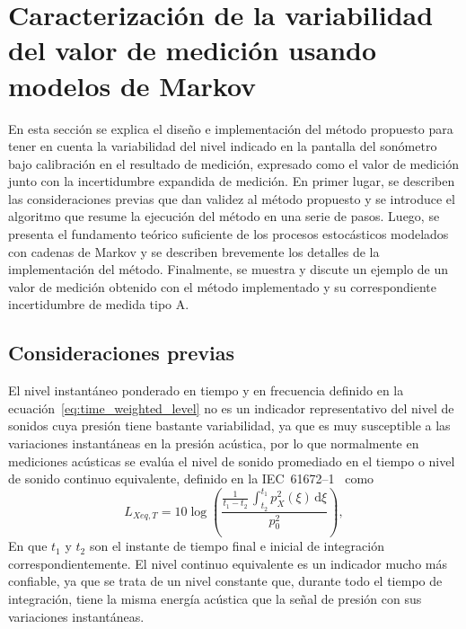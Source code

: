 
\chapter{Caracterización de la variabilidad del valor de medición usando modelos de Markov}

En esta sección se explica el diseño e implementación del método propuesto para tener en cuenta la variabilidad del nivel indicado en la pantalla del sonómetro bajo calibración en el resultado de medición, expresado como el valor de medición junto con la incertidumbre expandida de medición.
En primer lugar, se describen las consideraciones previas que dan validez al método propuesto y se introduce el algoritmo que resume la ejecución del método en una serie de pasos.
Luego, se presenta el fundamento teórico suficiente de los procesos estocásticos modelados con cadenas de Markov y se describen brevemente los detalles de la implementación del método.
Finalmente, se muestra y discute un ejemplo de un valor de medición obtenido con el método implementado y su correspondiente incertidumbre de medida tipo A\@.

\section*{Consideraciones previas}
El nivel instantáneo ponderado en tiempo y en frecuencia definido en la ecuación~\eqref{eq:time_weighted_level} no es un indicador representativo del nivel de sonidos cuya presión tiene bastante variabilidad, ya que es muy susceptible a las variaciones instantáneas en la presión acústica, por lo que normalmente en mediciones acústicas se evalúa el nivel de sonido promediado en el tiempo o nivel de sonido continuo equivalente, definido en la \mbox{IEC 61672--1}~\citeyearpar{IEC_TC29_2013_1} como
%
\begin{equation}
    \label{eq:equivalent_level}
    L_{Xeq,T} = 10\log{\left(\frac{\frac{1}{t_1 - t_2}\,\int_{t_2}^{t_1} p_X^2\left(\xi\right)\,\mathrm{d}\xi}{p_0^2}\right)},
\end{equation}
%
En que $t_1$ y $t_2$ son el instante de tiempo final e inicial de integración correspondientemente.
El nivel continuo equivalente es un indicador mucho más confiable, ya que se trata de un nivel constante que, durante todo el tiempo de integración, tiene la misma energía acústica que la señal de presión con sus variaciones instantáneas.

